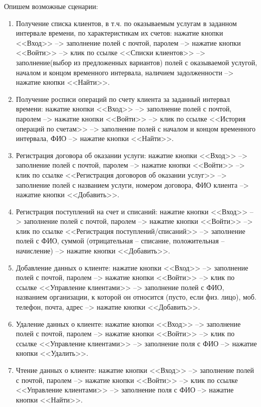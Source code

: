 \documentclass[oneside,senior,etd]{BYUPhysForDegree}
\begin{document}
Опишем возможные сценарии: 
\begin{enumerate}
    \item Получение списка клиентов, в т.ч. по оказываемым услугам в заданном интервале времени, по характеристикам их счетов:
    нажатие кнопки <<Вход>> --> заполнение полей с почтой, паролем --> нажатие кнопки <<Войти>> --> клик по ссылке <<Списки клиентов>> --> заполнение(выбор из предложенных вариантов) полей с оказываемой услугой, началом и концом временного интервала, наличием задолженности --> нажатие кнопки <<Найти>>.

    \item Получение росписи операций по счету клиента за заданный интервал времени:
    нажатие кнопки <<Вход>> --> заполнение полей с почтой, паролем --> нажатие кнопки <<Войти>> --> клик по ссылке <<История операций по счетам>> --> заполнение полей с началом и концом временного интервала, ФИО --> нажатие кнопки <<Найти>>.

    \item Регистрация договора об оказании услуги:
    нажатие кнопки <<Вход>> --> заполнение полей с почтой, паролем --> нажатие кнопки <<Войти>> --> клик по ссылке <<Регистрация договоров об оказании услуг>> --> заполнение полей с названием услуги, номером договора, ФИО клиента --> нажатие кнопки <<Добавить>>.


    \item Регистрация поступлений на счет и списаний:
    нажатие кнопки <<Вход>> --> заполнение полей с почтой, паролем --> нажатие кнопки <<Войти>> --> клик по ссылке <<Регистрация поступлений/списаний>> --> заполнение полей с ФИО, суммой (отрицательная -- списание, положительная -- начисление) --> нажатие кнопки <<Добавить>>.

    \item Добавление данных о клиенте:
    нажатие кнопки <<Вход>> --> заполнение полей с почтой, паролем --> нажатие кнопки <<Войти>> --> клик по ссылке <<Управление клиентами>> --> заполнение полей с ФИО, названием организации, к которой он относится (пусто, если физ. лицо), моб. телефон, почта, адрес --> нажатие кнопки <<Добавить>>.

    \item Удаление данных о клиенте:
    нажатие кнопки <<Вход>> --> заполнение полей с почтой, паролем --> нажатие кнопки <<Войти>> --> клик по ссылке <<Управление клиентами>> --> заполнение поля с ФИО --> нажатие кнопки <<Удалить>>.

    \item Чтение данных о клиенте:
    нажатие кнопки <<Вход>> --> заполнение полей с почтой, паролем --> нажатие кнопки <<Войти>> --> клик по ссылке <<Управление клиентами>> --> заполнение поля с ФИО --> нажатие кнопки <<Найти>>.


\end{enumerate}
\end{document}
